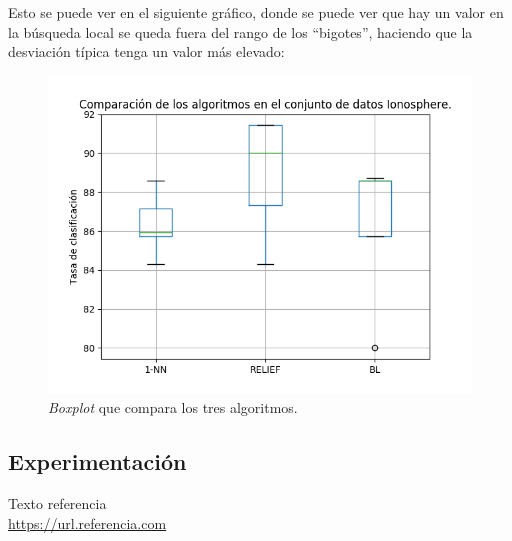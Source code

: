 \documentclass[11pt,a4paper]{article}
\begin{document}
Esto se puede ver en el siguiente gráfico, donde se puede ver que hay un valor en la búsqueda local se queda fuera del
rango de los ``bigotes'', haciendo que la desviación típica tenga un valor más elevado:

\begin{figure}[H]
\centering
\includegraphics[scale=0.8]{img/boxplot.png}
\caption{\textit{Boxplot} que compara los tres algoritmos.}
\end{figure}

\subsection{Experimentación}

\newpage



\begin{thebibliography}{5}

Texto referencia
\\\url{https://url.referencia.com}

\end{thebibliography}
\end{document}
